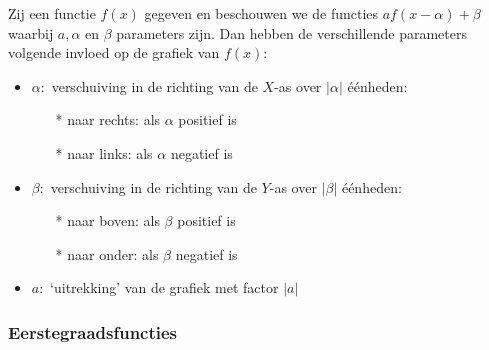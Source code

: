 Zij een functie $f(x)$ gegeven en beschouwen we de functies $af(x-\alpha)+\beta$ 		waarbij $a, \alpha$ en $\beta$ parameters zijn. Dan hebben de verschillende 		parameters volgende invloed op de grafiek van $f(x)$:\newline
\begin{itemize}
\item $\alpha :$ verschuiving in de richting van de $X$-as over $|\alpha|$ 		\'e\'enheden:\newline
	\begin{itemize}
	\item[*] naar rechts: als $\alpha$ positief is
	\item[*] naar links: als $\alpha$ negatief is
	\end{itemize}
\item $\beta :$ verschuiving in de richting van de $Y$-as over $|\beta|$ 		\'e\'enheden:\newline
	\begin{itemize}
	\item[*] naar boven: als $\beta$ positief is
	\item[*] naar onder: als $\beta$ negatief is
	\end{itemize}
\item $a :$ `uitrekking' van de grafiek met factor $|a|$
\end{itemize}

\hypertarget{eerstegraadsfuncties}{}
\subsubsection{Eerstegraadsfuncties} \label{eerstegraadsfuncties}

